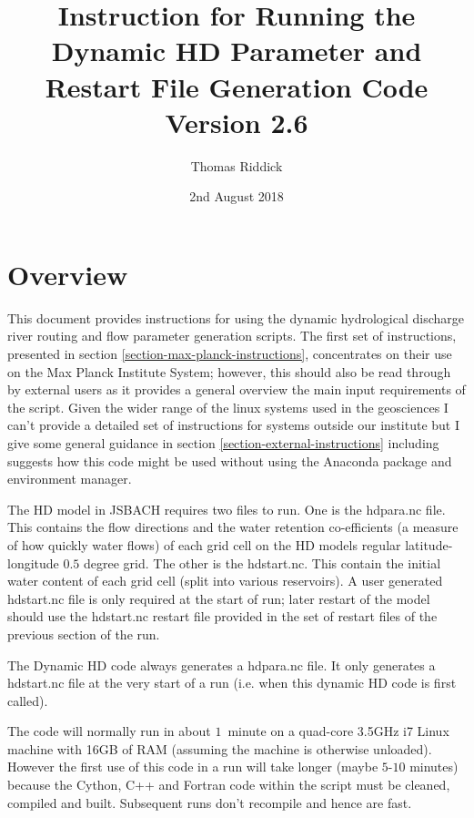 \documentclass{article}
\title{Instruction for Running the Dynamic HD Parameter and Restart File Generation Code Version 2.6}
\author{Thomas Riddick}
\date{2nd August 2018}
\begin{document}
\lstset{language=bash}
\maketitle
\section{Overview}
This document provides instructions for using the dynamic hydrological discharge river routing and flow parameter generation scripts. The first set of instructions, presented in section \ref{section-max-planck-instructions}, concentrates on their use on the Max Planck Institute System; however, this should also be read through by external users as it provides a general overview the main input requirements of the script. Given the wider range of the linux systems used in the geosciences I can't provide a detailed set of instructions for systems outside our institute but I give some general guidance in section \ref{section-external-instructions} including suggests how this code might be used without using the Anaconda package and environment manager.

The HD model in JSBACH requires two files to run. One is the hdpara.nc file. This contains the flow directions and the water retention co-efficients (a measure of how quickly water flows) of each grid cell on the HD models regular latitude-longitude $0.5$ degree grid. The other is the hdstart.nc. This contain the initial water content of each grid cell (split into various reservoirs). A user generated hdstart.nc file is only required at the start of run; later restart of the model should use the hdstart.nc restart file provided in the set of restart files of the previous section of the run. 

The Dynamic HD code always generates a hdpara.nc file. It only generates a hdstart.nc file at the very start of a run (i.e. when this dynamic HD code is first called). 

The code will normally run in about $1$~minute on a quad-core  3.5GHz i7 Linux machine with 16GB of RAM (assuming the machine is otherwise unloaded). However the first use of this code in a run will take longer (maybe $5$-$10$ minutes) because the Cython, C++ and Fortran code within the script must be cleaned, compiled and built. Subsequent runs don't recompile and hence are fast. 
\end{document}
